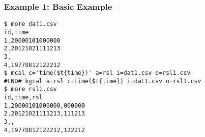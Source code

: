 \subsubsection*{Example 1: Basic Example}



\begin{Verbatim}[baselinestretch=0.7,frame=single]
$ more dat1.csv
id,time
1,20000101000000
2,20121021111213
3,
4,19770812122212
$ mcal c='time($t{time})' a=rsl i=dat1.csv o=rsl1.csv
#END# kgcal a=rsl c=time($t{time}) i=dat1.csv o=rsl1.csv
$ more rsl1.csv
id,time,rsl
1,20000101000000,000000
2,20121021111213,111213
3,,
4,19770812122212,122212
\end{Verbatim}
